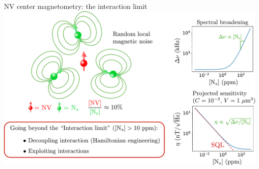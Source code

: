 \documentclass{beamer}
\begin{document}
\begin{frame}{NV center magnetometry: the interaction limit}
\centering
\includegraphics[width=\textwidth,height=0.85\textheight,keepaspectratio]{Slide_interaction_limit}
\end{frame}
\end{document}
